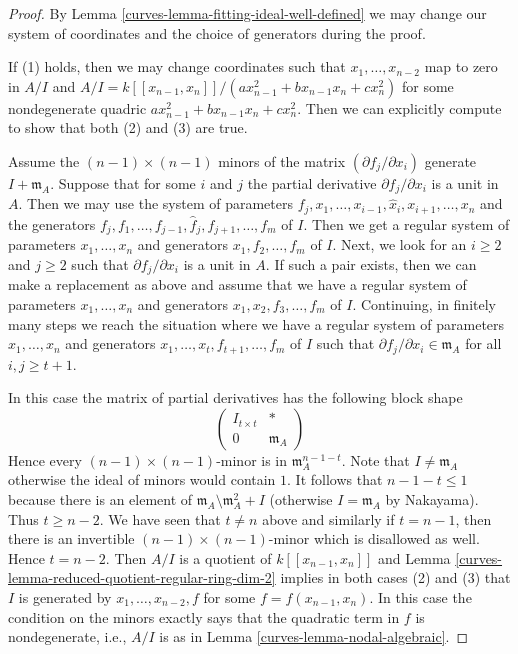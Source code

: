 \begin{proof}

By Lemma \ref{curves-lemma-fitting-ideal-well-defined}
we may change our system of coordinates and the
choice of generators during the proof.

\medskip\noindent
If (1) holds, then we may change coordinates such that
$x_1, \ldots, x_{n - 2}$ map to zero in $A/I$ and
$A/I = k[[x_{n - 1}, x_n]]/(a x_{n - 1}^2 + b x_{n - 1}x_n + c x_n^2)$
for some nondegenerate quadric $a x_{n - 1}^2 + b x_{n - 1}x_n + c x_n^2$.
Then we can explicitly compute to show that both (2) and (3) are true.

\medskip\noindent
Assume the $(n - 1) \times (n - 1)$ minors of the matrix
$(\partial f_j/\partial x_i)$ generate $I + \mathfrak m_A$.
Suppose that for some $i$ and $j$ the partial derivative
$\partial f_j/\partial x_i$ is a unit in $A$. Then
we may use the system of parameters
$f_j, x_1, \ldots, x_{i - 1}, \hat x_i, x_{i + 1}, \ldots, x_n$
and the generators
$f_j, f_1, \ldots, f_{j - 1}, \hat f_j, f_{j + 1}, \ldots, f_m$
of $I$. Then we get a regular system of parameters $x_1, \ldots, x_n$
and generators $x_1, f_2, \ldots, f_m$ of $I$.
Next, we look for an $i \geq 2$ and $j \geq 2$ such that
$\partial f_j/\partial x_i$ is a unit in $A$. If such a pair
exists, then we can make a replacement as above and assume
that we have a regular system of parameters
$x_1, \ldots, x_n$ and generators $x_1, x_2, f_3, \ldots, f_m$ of $I$.
Continuing, in finitely many steps we reach the situation where
we have a regular system of parameters
$x_1, \ldots, x_n$ and generators
$x_1, \ldots, x_t, f_{t + 1}, \ldots, f_m$ of $I$
such that $\partial f_j/\partial x_i \in \mathfrak m_A$
for all $i, j \geq t + 1$.

\medskip\noindent
In this case the matrix of partial derivatives has the following
block shape
$$
\left(
\begin{matrix}
I_{t \times t} & * \\
0 & \mathfrak m_A
\end{matrix}
\right)
$$
Hence every $(n - 1) \times (n - 1)$-minor is in $\mathfrak m_A^{n - 1 - t}$.
Note that $I \not = \mathfrak m_A$ otherwise the ideal of minors
would contain $1$. It follows that $n - 1 - t \leq 1$ because there
is an element of $\mathfrak m_A \setminus \mathfrak m_A^2 + I$ (otherwise
$I = \mathfrak m_A$ by Nakayama). Thus $t \geq n - 2$.
We have seen that $t \not = n$ above and similarly if
$t = n - 1$, then there is an invertible $(n - 1) \times (n - 1)$-minor
which is disallowed as well. Hence $t = n - 2$.
Then $A/I$ is a quotient of $k[[x_{n - 1}, x_n]]$ and
Lemma \ref{curves-lemma-reduced-quotient-regular-ring-dim-2}
implies in both cases (2) and (3) that $I$ is generated by
$x_1, \ldots, x_{n - 2}, f$ for some $f = f(x_{n - 1}, x_n)$.
In this case the condition on the minors exactly says that the quadratic
term in $f$ is nondegenerate, i.e., $A/I$ is as in
Lemma \ref{curves-lemma-nodal-algebraic}.
\end{proof}

